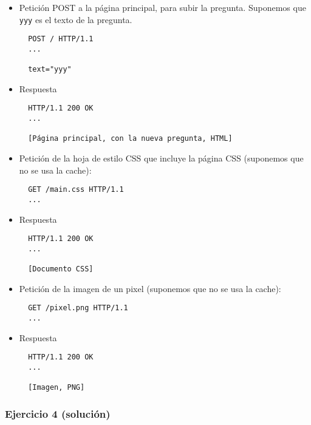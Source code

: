 \begin{itemize}

\item Petición POST a la página principal, para subir la pregunta. Suponemos que \texttt{yyy} es el texto de la pregunta. 

\begin{verbatim}
  POST / HTTP/1.1
  ...

  text="yyy"
\end{verbatim}

\item Respuesta

\begin{verbatim}
  HTTP/1.1 200 OK
  ...

  [Página principal, con la nueva pregunta, HTML]
\end{verbatim}

\item Petición de la hoja de estilo CSS que incluye la página CSS (suponemos que no se usa la cache):

  \begin{verbatim}
  GET /main.css HTTP/1.1
  ...
\end{verbatim}

\item Respuesta

\begin{verbatim}
  HTTP/1.1 200 OK
  ...

  [Documento CSS]
\end{verbatim}

\item Petición de la imagen de un pixel (suponemos que no se usa la cache):

  \begin{verbatim}
  GET /pixel.png HTTP/1.1
  ...
\end{verbatim}

\item Respuesta

\begin{verbatim}
  HTTP/1.1 200 OK
  ...

  [Imagen, PNG]
\end{verbatim}
\end{itemize}


\subsubsection{Ejercicio 4  (solución)}

